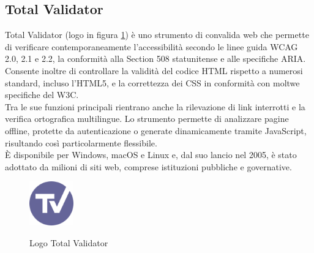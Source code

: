 \subsection{Total Validator}
\label{subsec:tv}
\noindent Total Validator (logo in figura \ref{fig:logo_TV}) è uno strumento di convalida web che permette di verificare contemporaneamente l’accessibilità secondo le linee guida WCAG 2.0, 2.1 e 2.2, la conformità alla Section 508 statunitense e alle specifiche ARIA. \\Consente inoltre di controllare la validità del codice HTML rispetto a numerosi standard, incluso l’HTML5, e la correttezza dei CSS in conformità con moltwe specifiche del W3C. \\Tra le sue funzioni principali rientrano anche la rilevazione di link interrotti e la verifica ortografica multilingue. Lo strumento permette di analizzare pagine offline, protette da autenticazione o generate dinamicamente tramite JavaScript, risultando così particolarmente flessibile. \\È disponibile per Windows, macOS e Linux e, dal suo lancio nel 2005, è stato adottato da milioni di siti web, comprese istituzioni pubbliche e governative.
\begin{figure}[H]
    \centering
    \includegraphics[width=0.17\textwidth, alt={Logo Total Validator}]{img/totalvalidator.png}
    \caption[Logo Total Validator]{Logo Total Validator}\label{fig:logo_TV}
\end{figure}

